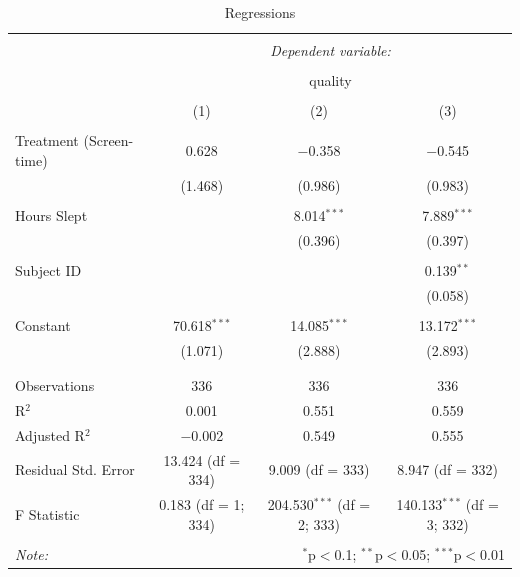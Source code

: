 \documentclass[]{article}
\begin{document}
\begin{table}[!htbp] \centering 
  \caption{\label{tab:regressions} Regressions} 
  \label{} 
\begin{tabular}{@{\extracolsep{5pt}}lccc} 
\\[-1.8ex]\hline 
\hline \\[-1.8ex] 
 & \multicolumn{3}{c}{\textit{Dependent variable:}} \\ 
\cline{2-4} 
\\[-1.8ex] & \multicolumn{3}{c}{quality} \\ 
\\[-1.8ex] & (1) & (2) & (3)\\ 
\hline \\[-1.8ex] 
 Treatment (Screen-time) & 0.628 & $-$0.358 & $-$0.545 \\ 
  & (1.468) & (0.986) & (0.983) \\ 
  & & & \\ 
 Hours Slept &  & 8.014$^{***}$ & 7.889$^{***}$ \\ 
  &  & (0.396) & (0.397) \\ 
  & & & \\ 
 Subject ID &  &  & 0.139$^{**}$ \\ 
  &  &  & (0.058) \\ 
  & & & \\ 
 Constant & 70.618$^{***}$ & 14.085$^{***}$ & 13.172$^{***}$ \\ 
  & (1.071) & (2.888) & (2.893) \\ 
  & & & \\ 
\hline \\[-1.8ex] 
Observations & 336 & 336 & 336 \\ 
R$^{2}$ & 0.001 & 0.551 & 0.559 \\ 
Adjusted R$^{2}$ & $-$0.002 & 0.549 & 0.555 \\ 
Residual Std. Error & 13.424 (df = 334) & 9.009 (df = 333) & 8.947 (df = 332) \\ 
F Statistic & 0.183 (df = 1; 334) & 204.530$^{***}$ (df = 2; 333) & 140.133$^{***}$ (df = 3; 332) \\ 
\hline 
\hline \\[-1.8ex] 
\textit{Note:}  & \multicolumn{3}{r}{$^{*}$p$<$0.1; $^{**}$p$<$0.05; $^{***}$p$<$0.01} \\ 
\end{tabular} 
\end{table}
\end{document}
